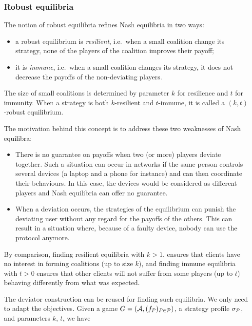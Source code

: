 \subsubsection{Robust equilibria}\label{robust-equilibria.}
The notion of robust equilibria refines Nash equilibria in two ways:

\begin{itemize}

\item
  a robust equilibrium is \emph{resilient}, i.e.~when a small coalition
  change its strategy, none of the players of the coalition improves their
  payoff;
\item
  it is \emph{immune}, i.e.~when a small coalition changes its strategy,
  it does not decrease the payoffs of the non-deviating players.
\end{itemize}

The size of small coalitions is determined by parameter \(k\) for
resilience and \(t\) for immunity. When a strategy is both
\(k\)-resilient and \(t\)-immune, it is called a \((k,t)\)-robust
equilibrium.

The motivation behind this concept is to address these two weaknesses of
Nash equilibra:

\begin{itemize}

\item
  There is no guarantee on payoffs when two (or more) players deviate together.
  Such a situation can occur in networks if the same person controls several devices
  (a laptop and a phone for instance) and can then coordinate their
  behaviours. In this case, the devices would be considered as different
  players and Nash equilibria can offer no guarantee.
\item
  When a deviation occurs, the strategies of the equilibrium can punish
  the deviating user without any regard for the payoffs of the others. This
  can result in a situation where, because of a faulty device, nobody
  can use the protocol anymore.
\end{itemize}

By comparison, finding resilient equilibria with \(k>1\), 
ensures that clients have no interest in forming coalitions (up
to size \(k\)), and finding immune equilibria with \(t>0\)
ensures that other clients will not suffer from some players (up to
\(t\)) behaving differently from what was expected.

The deviator construction can be reused for finding such equilibria. We
only need to adapt the objectives. Given a game \(G=(\mathcal{A}, (f_P)_{P \in \mathcal{P}})\), a
strategy profile \(\sigma_{\mathcal{P}}\), and parameters \(k\), \(t\), we have

